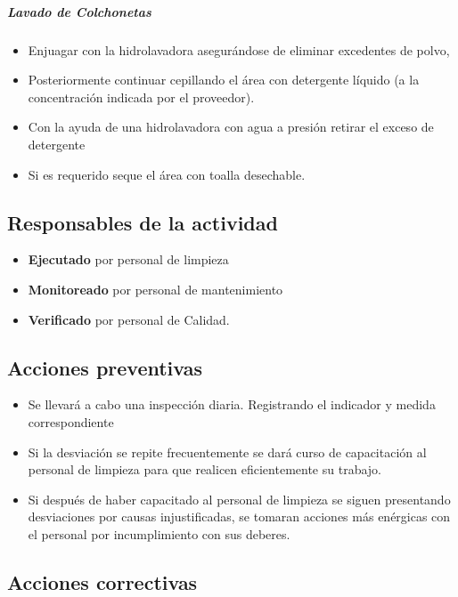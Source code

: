 \subparagraph{Lavado de Colchonetas}

\begin{itemize}
	\item Enjuagar con la hidrolavadora asegurándose de eliminar excedentes de polvo,
	\item Posteriormente continuar cepillando el área con detergente líquido (a la concentración indicada por el proveedor).
	\item Con la ayuda de una hidrolavadora con agua a presión retirar el exceso de detergente
	\item Si es requerido seque el área con toalla desechable.
\end{itemize}

\subsection{Responsables de la actividad}

\begin{itemize}
	\item \textbf{Ejecutado} por personal de limpieza
	\item \textbf{Monitoreado} por personal de mantenimiento
	\item \textbf{Verificado} por personal de Calidad.
\end{itemize}

\subsection{Acciones preventivas}

\begin{itemize}
	\item Se llevará a cabo una inspección diaria. Registrando el indicador y medida correspondiente
	\item Si la desviación se repite frecuentemente se dará curso de capacitación al personal de limpieza para que realicen eficientemente su trabajo.
	\item Si después de haber capacitado al personal de limpieza se siguen presentando desviaciones por causas injustificadas, se tomaran acciones más enérgicas con el personal por incumplimiento con sus deberes.
\end{itemize}

\subsection{Acciones correctivas}

